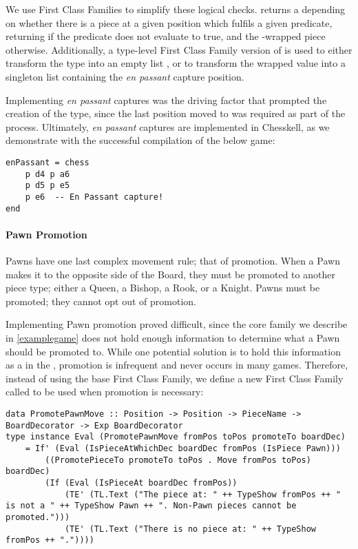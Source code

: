 We use First Class Families to simplify these logical checks.  returns a  depending on whether there is a piece at a given position which fulfils a given predicate, returning  if the predicate does not evaluate to true, and the -wrapped piece otherwise. Additionally, a type-level First Class Family version of  is used to either transform the  type into an empty list , or to transform the wrapped value into a singleton list containing the \emph{en passant} capture position.

Implementing \emph{en passant} captures was the driving factor that prompted the creation of the  type, since the last position moved to was required as part of the process. Ultimately, \emph{en passant} captures are implemented in Chesskell, as we demonstrate with the successful compilation of the below game:

\begin{lstlisting}
enPassant = chess
    p d4 p a6
    p d5 p e5
    p e6  -- En Passant capture!
end
\end{lstlisting}

\paragraph{Pawn Promotion}

Pawns have one last complex movement rule; that of promotion. When a Pawn makes it to the opposite side of the Board, they must be promoted to another piece type; either a Queen, a Bishop, a Rook, or a Knight. Pawns must be promoted; they cannot opt out of promotion.

Implementing Pawn promotion proved difficult, since the core  family we describe in \cref{examplegame} does not hold enough information to determine what a Pawn should be promoted to. While one potential solution is to hold this information as a  in the , promotion is infrequent and never occurs in many games. Therefore, instead of using the base  First Class Family, we define a new First Class Family called  to be used when promotion is necessary:

\begin{lstlisting}
data PromotePawnMove :: Position -> Position -> PieceName -> BoardDecorator -> Exp BoardDecorator
type instance Eval (PromotePawnMove fromPos toPos promoteTo boardDec)
    = If' (Eval (IsPieceAtWhichDec boardDec fromPos (IsPiece Pawn)))
        ((PromotePieceTo promoteTo toPos . Move fromPos toPos) boardDec)
        (If (Eval (IsPieceAt boardDec fromPos))
            (TE' (TL.Text ("The piece at: " ++ TypeShow fromPos ++ " is not a " ++ TypeShow Pawn ++ ". Non-Pawn pieces cannot be promoted.")))
            (TE' (TL.Text ("There is no piece at: " ++ TypeShow fromPos ++ "."))))
\end{lstlisting}

